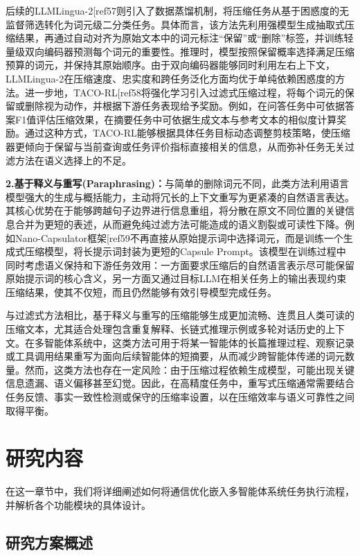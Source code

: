 \documentclass[11pt, a4paper]{article}
\makeatletter
\let\oldcite\cite
\renewcommand{\cite}{\@ifnextchar[{\cite@with}{\cite@without}}
\newcommand{\cite@with}[2][]{\textsuperscript{\oldcite[#1]{#2}}}
\newcommand{\cite@without}[1]{\textsuperscript{\oldcite{#1}}}
\numberwithin{figure}{section}
\makeatother
\begin{document}
    后续的LLMLingua-2\cite{ref57}则引入了数据蒸馏机制，将压缩任务从基于困惑度的无监督筛选转化为词元级二分类任务。具体而言，该方法先利用强模型生成抽取式压缩结果，再通过自动对齐为原始文本中的词元标注“保留”或“删除”标签，并训练轻量级双向编码器预测每个词元的重要性。推理时，模型按照保留概率选择满足压缩预算的词元，并保持其原始顺序。由于双向编码器能够同时利用左右上下文，LLMLingua-2在压缩速度、忠实度和跨任务泛化方面均优于单纯依赖困惑度的方法。进一步地，TACO-RL\cite{ref58}将强化学习引入过滤式压缩过程，将每个词元的保留或删除视为动作，并根据下游任务表现给予奖励。例如，在问答任务中可依据答案F1值评估压缩效果，在摘要任务中可依据生成文本与参考文本的相似度计算奖励。通过这种方式，TACO-RL能够根据具体任务目标动态调整剪枝策略，使压缩器更倾向于保留与当前查询或任务评价指标直接相关的信息，从而弥补任务无关过滤方法在语义选择上的不足。

    \par\textbf{2.基于释义与重写(Paraphrasing)：}与简单的删除词元不同，此类方法利用语言模型强大的生成与概括能力，主动将冗长的上下文重写为更紧凑的自然语言表达。其核心优势在于能够跨越句子边界进行信息重组，将分散在原文不同位置的关键信息合并为更短的表述，从而避免纯过滤方法可能造成的语义割裂或可读性下降。例如Nano-Capsulator框架\cite{ref59}不再直接从原始提示词中选择词元，而是训练一个生成式压缩模型，将长提示词封装为更短的Capsule Prompt。该模型在训练过程中同时考虑语义保持和下游任务效用：一方面要求压缩后的自然语言表示尽可能保留原始提示词的核心含义，另一方面又通过目标LLM在相关任务上的输出表现约束压缩结果，使其不仅短，而且仍然能够有效引导模型完成任务。

    与过滤式方法相比，基于释义与重写的压缩能够生成更加流畅、连贯且人类可读的压缩文本，尤其适合处理包含重复解释、长链式推理示例或多轮对话历史的上下文。在多智能体系统中，这类方法可用于将某一智能体的长篇推理过程、观察记录或工具调用结果重写为面向后续智能体的短摘要，从而减少跨智能体传递的词元数量。然而，这类方法也存在一定风险：由于压缩过程依赖生成模型，可能出现关键信息遗漏、语义偏移甚至幻觉。因此，在高精度任务中，重写式压缩通常需要结合任务反馈、事实一致性检测或保守的压缩率设置，以在压缩效率与语义可靠性之间取得平衡。

\newpage
\section{研究内容}

在这一章节中，我们将详细阐述如何将通信优化嵌入多智能体系统任务执行流程，并解析各个功能模块的具体设计。

\subsection{研究方案概述}
\end{document}
